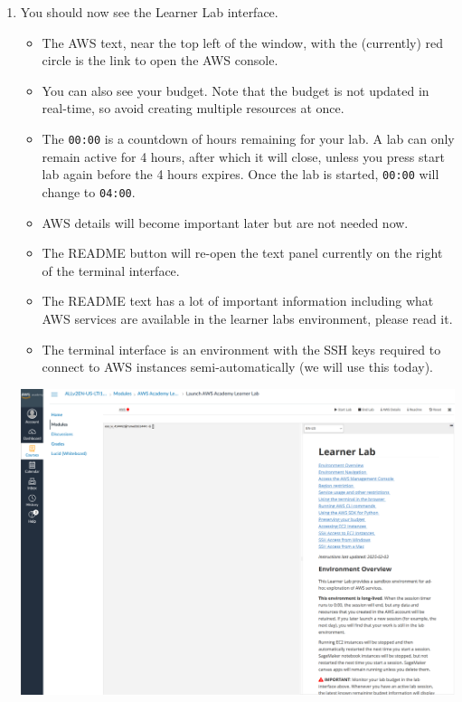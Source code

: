 \documentclass{csse4400}
\begin{document}
\begin{enumerate}
\item You should now see the Learner Lab interface.
\begin{itemize}
      \item The AWS text, near the top left of the window, with the (currently) red circle is the link to open the AWS console.
      \item You can also see your budget. Note that the budget is not updated in real-time, so avoid creating multiple resources at once.
      \item The \texttt{00:00} is a countdown of hours remaining for your lab.
      A lab can only remain active for 4 hours, after which it will close, unless you press start lab again before the 4 hours expires.
      Once the lab is started, \texttt{00:00} will change to \texttt{04:00}.
      \item AWS details will become important later but are not needed now.
      \item The README button will re-open the text panel currently on the right of the terminal interface.
      \item The README text has a lot of important information including what AWS services are available in the learner labs environment, please read it.
      \item The terminal interface is an environment with the SSH keys required to connect to AWS instances semi-automatically (we will use this today).
\end{itemize}

\hspace{-16mm}
\includegraphics[width=1.05\textwidth]{images/lab-interface}


\end{enumerate}
\end{document}
